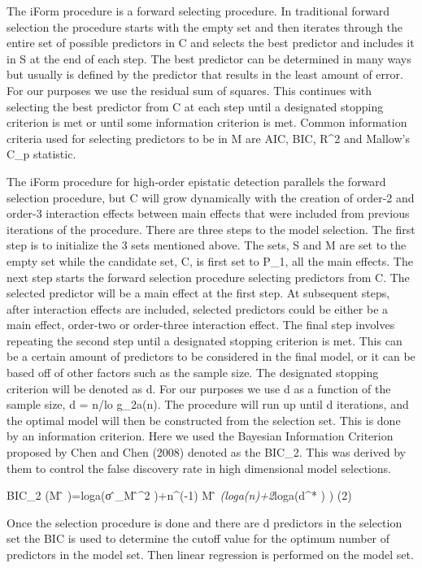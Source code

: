 \documentclass[]{book}
\theoremstyle{definition}
\theoremstyle{definition}
\theoremstyle{remark}
\begin{document}
The iForm procedure is a forward selecting procedure. In traditional
forward selection the procedure starts with the empty set and then
iterates through the entire set of possible predictors in C and selects
the best predictor and includes it in S at the end of each step. The
best predictor can be determined in many ways but usually is defined by
the predictor that results in the least amount of error. For our
purposes we use the residual sum of squares. This continues with
selecting the best predictor from C at each step until a designated
stopping criterion is met or until some information criterion is met.
Common information criteria used for selecting predictors to be in M are
AIC, BIC, R\^{}2 and Mallow's C\_p statistic.

The iForm procedure for high-order epistatic detection parallels the
forward selection procedure, but C will grow dynamically with the
creation of order-2 and order-3 interaction effects between main effects
that were included from previous iterations of the procedure. There are
three steps to the model selection. The first step is to initialize the
3 sets mentioned above. The sets, S and M are set to the empty set while
the candidate set, C, is first set to P\_1, all the main effects. The
next step starts the forward selection procedure selecting predictors
from C. The selected predictor will be a main effect at the first step.
At subsequent steps, after interaction effects are included, selected
predictors could be either be a main effect, order-two or order-three
interaction effect. The final step involves repeating the second step
until a designated stopping criterion is met. This can be a certain
amount of predictors to be considered in the final model, or it can be
based off of other factors such as the sample size. The designated
stopping criterion will be denoted as d. For our purposes we use d as a
function of the sample size, d = n/lo g\_2a(n). The procedure will run
up until d iterations, and the optimal model will then be constructed
from the selection set. This is done by an information criterion. Here
we used the Bayesian Information Criterion proposed by Chen and Chen
(2008) denoted as the BIC\_2. This was derived by them to control the
false discovery rate in high dimensional model selections.

BIC\_2 (M ̂ )=loga(σ ̂\_M ̂\^{}2 )+n\^{}(-1) \textbar{}M ̂
\textbar{}\emph{(loga(n)+2}loga(d\^{}* ) ) (2)

Once the selection procedure is done and there are d predictors in the
selection set the BIC is used to determine the cutoff value for the
optimum number of predictors in the model set. Then linear regression is
performed on the model set.
\end{document}
